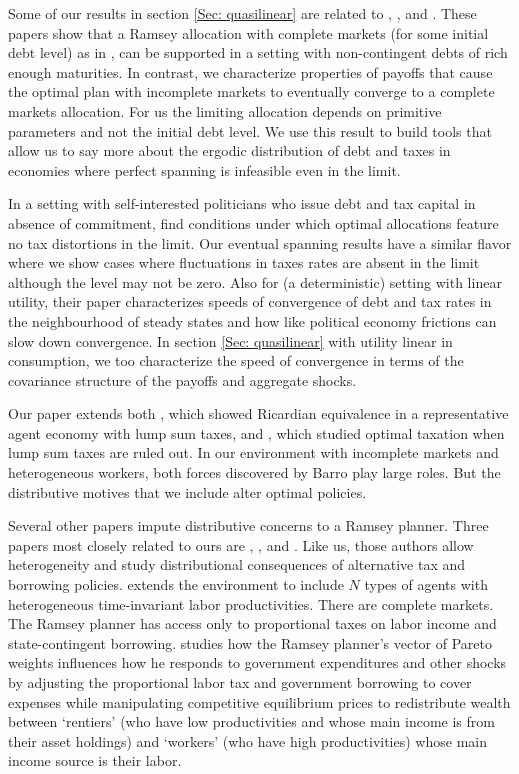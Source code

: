 \documentclass[thmsb,11pt]{article}
\begin{document}
Some of our results in section \ref{Sec: quasilinear}  are related to \citet{Angeletos}, \citet{Buera_Nicolini}, and \citet{Shin2007}. These papers show that a Ramsey allocation with complete markets (for some initial debt level) as in \citet{LucasJr.1983}, can be supported in a setting with non-contingent debts of rich enough maturities. In contrast, we characterize properties of payoffs that cause the optimal plan with incomplete markets to  eventually converge to a  complete markets allocation. For us the limiting allocation depends on  primitive parameters and not the initial debt level. We use this result to build tools that allow us to say more about the ergodic distribution of debt and taxes in economies where perfect spanning is infeasible even in the limit.

In a setting with self-interested politicians who issue debt and tax capital in absence of commitment, \citet{AA2011} find conditions under which optimal allocations feature no tax distortions in the limit. Our eventual spanning results have a similar flavor where we show cases where fluctuations in taxes rates are absent in the limit although the level may not be zero. Also for (a deterministic) setting with linear utility, their paper characterizes speeds of convergence of debt and tax rates in the neighbourhood of steady states and how like political economy frictions can slow down convergence. In section \ref{Sec: quasilinear} with utility linear in consumption, we too characterize the speed of convergence in terms of the covariance structure of the payoffs and aggregate shocks.  


Our paper extends both \citet{Barro1974}, which showed Ricardian equivalence in a representative agent economy with lump sum taxes,
and \citet{Barro1979}, which studied  optimal taxation  when lump sum taxes are ruled out. In our environment with incomplete markets and heterogeneous workers,
both forces discovered by Barro play large roles.  But the distributive motives that we include alter optimal policies.

Several other papers impute distributive concerns to a Ramsey planner.
Three papers  most closely related to ours are \citet{Bassetto1999}, \citet{shin2006ramsey}, and \citet{Wer07a}. Like us, those authors allow heterogeneity and study
distributional consequences of alternative tax and borrowing policies.
\citet{Bassetto1999} extends the \citet{LucasJr.1983} environment to include $N$ types of
agents with heterogeneous  time-invariant labor productivities. There are complete markets.  The Ramsey planner  has access only
to proportional taxes on labor income and state-contingent borrowing. \citeauthor{Bassetto1999}  studies how the Ramsey planner's vector of Pareto weights
influences how he responds to government expenditures and other shocks by
adjusting the proportional labor tax and government borrowing to cover
expenses while manipulating competitive equilibrium prices to redistribute wealth between
 `rentiers' (who have low productivities and  whose main income is from their asset holdings)
and  `workers' (who have high productivities) whose main income source is their labor.
\end{document}
